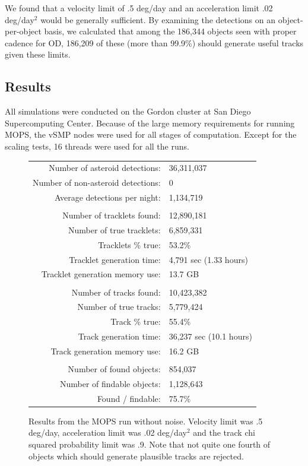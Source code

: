 We found that a velocity limit of .5 deg/day and an acceleration limit
.02 deg/day$^2$ would be generally sufficient.  By examining the
detections on an object-per-object basis, we calculated that among the
186,344 objects seen with proper cadence for OD, 186,209 of these
(more than 99.9\%) should generate useful tracks given these limits.






\subsection{Results}

All simulations were conducted on the Gordon cluster at San Diego
Supercomputing Center.  Because of the large memory requirements for
running MOPS, the vSMP nodes were used for all stages of computation.
Except for the scaling tests, 16 threads were used for all the runs.


\begin{figure}[ht!]
\centering
\begin{tabular}{|r l|}
\hline
Number of asteroid detections: & 36,311,037 \\
Number of non-asteroid detections: & 0 \\
Average detections per night: & 1,134,719 \\
 & \\
Number of tracklets found: & 12,890,181 \\
Number of true tracklets: & 6,859,331 \\
Tracklets \% true: & 53.2\%\\
Tracklet generation time: & 4,791 sec (1.33 hours) \\
Tracklet generation memory use: & 13.7 GB  \\
 & \\
Number of tracks found: & 10,423,382 \\
Number of true tracks: & 5,779,424 \\
Track \% true: & 55.4\% \\
Track generation time: & 36,237 sec (10.1 hours) \\
Track generation memory use: & 16.2 GB \\
 & \\
Number of found objects: & 854,037 \\
Number of findable objects: & 1,128,643 \\
Found / findable: & 75.7\% \\
\hline
\end{tabular}

\caption{Results from the MOPS run without noise.  Velocity limit was .5 deg/day, acceleration limit was .02 deg/day$^2$ and the track chi squared probability limit was .9.  Note that not quite one fourth of objects which should generate plausible tracks are rejected.}
\label{oneMonth}
\end{figure}

